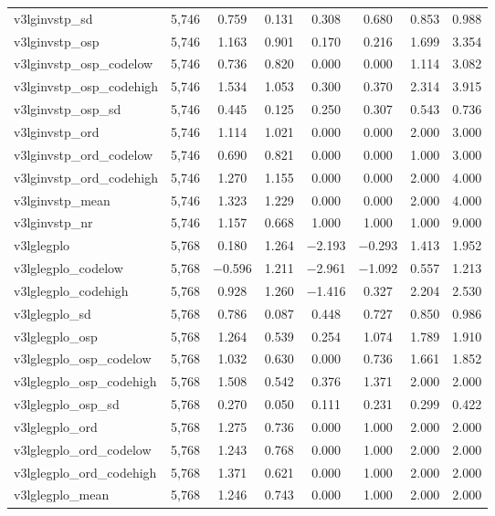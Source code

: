 \begin{table}[!htbp]
\begin{tabular}{@{\extracolsep{5pt}}lccccccc}
v3lginvstp\_sd & 5,746 & 0.759 & 0.131 & 0.308 & 0.680 & 0.853 & 0.988 \\ 
v3lginvstp\_osp & 5,746 & 1.163 & 0.901 & 0.170 & 0.216 & 1.699 & 3.354 \\ 
v3lginvstp\_osp\_codelow & 5,746 & 0.736 & 0.820 & 0.000 & 0.000 & 1.114 & 3.082 \\ 
v3lginvstp\_osp\_codehigh & 5,746 & 1.534 & 1.053 & 0.300 & 0.370 & 2.314 & 3.915 \\ 
v3lginvstp\_osp\_sd & 5,746 & 0.445 & 0.125 & 0.250 & 0.307 & 0.543 & 0.736 \\ 
v3lginvstp\_ord & 5,746 & 1.114 & 1.021 & 0.000 & 0.000 & 2.000 & 3.000 \\ 
v3lginvstp\_ord\_codelow & 5,746 & 0.690 & 0.821 & 0.000 & 0.000 & 1.000 & 3.000 \\ 
v3lginvstp\_ord\_codehigh & 5,746 & 1.270 & 1.155 & 0.000 & 0.000 & 2.000 & 4.000 \\ 
v3lginvstp\_mean & 5,746 & 1.323 & 1.229 & 0.000 & 0.000 & 2.000 & 4.000 \\ 
v3lginvstp\_nr & 5,746 & 1.157 & 0.668 & 1.000 & 1.000 & 1.000 & 9.000 \\ 
v3lglegplo & 5,768 & 0.180 & 1.264 & $-$2.193 & $-$0.293 & 1.413 & 1.952 \\ 
v3lglegplo\_codelow & 5,768 & $-$0.596 & 1.211 & $-$2.961 & $-$1.092 & 0.557 & 1.213 \\ 
v3lglegplo\_codehigh & 5,768 & 0.928 & 1.260 & $-$1.416 & 0.327 & 2.204 & 2.530 \\ 
v3lglegplo\_sd & 5,768 & 0.786 & 0.087 & 0.448 & 0.727 & 0.850 & 0.986 \\ 
v3lglegplo\_osp & 5,768 & 1.264 & 0.539 & 0.254 & 1.074 & 1.789 & 1.910 \\ 
v3lglegplo\_osp\_codelow & 5,768 & 1.032 & 0.630 & 0.000 & 0.736 & 1.661 & 1.852 \\ 
v3lglegplo\_osp\_codehigh & 5,768 & 1.508 & 0.542 & 0.376 & 1.371 & 2.000 & 2.000 \\ 
v3lglegplo\_osp\_sd & 5,768 & 0.270 & 0.050 & 0.111 & 0.231 & 0.299 & 0.422 \\ 
v3lglegplo\_ord & 5,768 & 1.275 & 0.736 & 0.000 & 1.000 & 2.000 & 2.000 \\ 
v3lglegplo\_ord\_codelow & 5,768 & 1.243 & 0.768 & 0.000 & 1.000 & 2.000 & 2.000 \\ 
v3lglegplo\_ord\_codehigh & 5,768 & 1.371 & 0.621 & 0.000 & 1.000 & 2.000 & 2.000 \\ 
v3lglegplo\_mean & 5,768 & 1.246 & 0.743 & 0.000 & 1.000 & 2.000 & 2.000 \\ 

\end{tabular}
\end{table}
